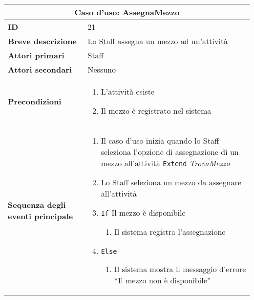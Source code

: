 \documentclass[a4paper]{report}
\begin{document}
\clearpage
\begin{table}[H]
\vspace*{-0cm}
\renewcommand{\arraystretch}{1.9}
\begin{tabular}{|p{3.9cm}|p{9.9cm}|}
\hline
\multicolumn{2}{|c|}{\textbf{Caso d’uso: AssegnaMezzo}} \\ \hline
	\textbf{ID} & 21 \\ \hline
	\textbf{Breve descrizione} & Lo Staff assegna un mezzo ad un’attività \\ \hline
	\textbf{Attori primari} & Staff \\ \hline
	\textbf{Attori secondari} & Nessuno \\ \hline
	\textbf{Precondizioni} & \begin{enumerate}[leftmargin=14pt,label=\arabic*.,labelsep=0.5em,topsep=0pt,partopsep=0pt,parsep=0pt,itemsep=0pt]
    \item L’attività esiste
    \item Il mezzo è registrato nel sistema
\end{enumerate} \\ \hline
	\textbf{Sequenza degli eventi principale} & \begin{enumerate}[leftmargin=14pt,label=\arabic*.,labelsep=0.5em,topsep=0pt,partopsep=0pt,parsep=0pt,itemsep=0pt]
    \item Il caso d'uso inizia quando lo Staff seleziona l'opzione di assegnazione di un mezzo all'attività
    \newline \texttt{Extend} \textit{TrovaMezzo}
    \item Lo Staff seleziona un mezzo da assegnare all’attività
    \item \texttt{If} Il mezzo è disponibile
    \begin{enumerate}[label=\arabic{enumi}.\arabic*.,leftmargin=22pt,labelsep=0.5em,topsep=0pt,partopsep=0pt,parsep=0pt,itemsep=0pt]
        \item Il sistema registra l’assegnazione
    \end{enumerate}
    \item \texttt{Else}
    \begin{enumerate}[label=\arabic{enumi}.\arabic*.,leftmargin=22pt,labelsep=0.5em,topsep=0pt,partopsep=0pt,parsep=0pt,itemsep=0pt]
        \item Il sistema mostra il messaggio d’errore “Il mezzo non è disponibile”
    \end{enumerate}
\end{enumerate} \\ \hline

\end{tabular}
\end{table}
\end{document}
